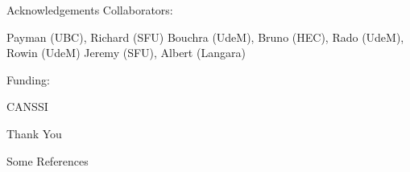 \documentclass[14pt]{beamer}
\begin{document}
\begin{frame}{Acknowledgements}
    Collaborators:
    \begin{outline}
        \1 Payman (UBC), Richard (SFU)
        \1 Bouchra (UdeM), Bruno (HEC), Rado (UdeM), Rowin (UdeM)
        \1 Jeremy (SFU), Albert (Langara) \newline
    \end{outline}

    Funding:
    \begin{outline}
        \1 CANSSI
    \end{outline}
\end{frame}



\begin{frame}
    \centering
    \Huge Thank You
\end{frame}

\begin{frame}{Some References}
    
    
\end{frame}
\end{document}

